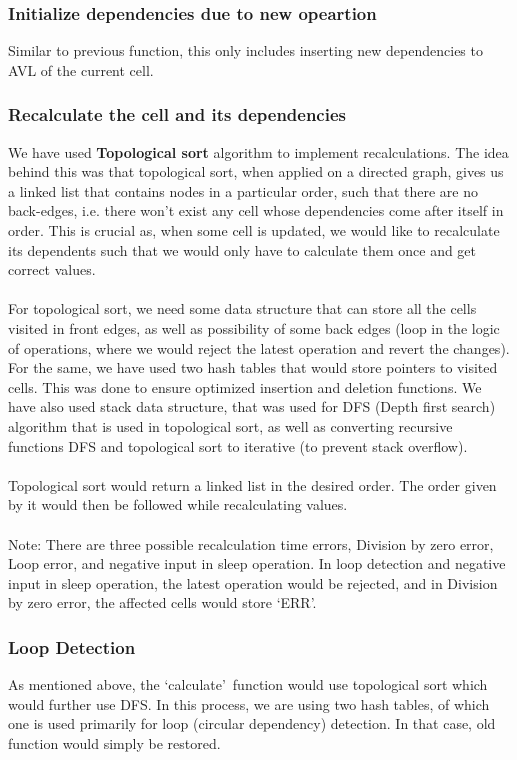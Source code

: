 \documentclass{article}
\begin{document}
\subsubsection{Initialize dependencies due to new opeartion}
Similar to previous function, this only includes inserting new dependencies to AVL of the current cell.
\subsubsection{Recalculate the cell and its dependencies}
We have used \textbf{Topological sort} algorithm to implement recalculations. The idea behind this was that topological sort, when applied on a directed graph, gives us a linked list that contains nodes in a particular order, such that there are no back-edges, i.e. there won't exist any cell whose dependencies come after itself in order. This is crucial as, when some cell is updated, we would like to recalculate its dependents such that we would only have to calculate them once and get correct values. 
\\ \\
For topological sort, we need some data structure that can store all the cells visited in front edges, as well as possibility of some back edges (loop in the logic of operations, where we would reject the latest operation and revert the changes). For the same, we have used two hash tables that would store pointers to visited cells. This was done to ensure optimized insertion and deletion functions. We have also used stack data structure, that was used for DFS (Depth first search) algorithm that is used in topological sort, as well as converting recursive functions DFS and topological sort to iterative (to prevent stack overflow).
\\ \\ 
Topological sort would return a linked list in the desired order. The order given by it would then be followed while recalculating values.
\\ \\ 
Note: There are three possible recalculation time errors, Division by zero error, Loop error, and negative input in sleep operation. In loop detection and negative input in sleep operation, the latest operation would be rejected, and in Division by zero error, the affected cells would store \textquoteleft ERR\textquoteright.

\subsubsection{Loop Detection}
As mentioned above, the \textquoteleft calculate\textquoteright \ function would use topological sort which would further use DFS. In this process, we are using two hash tables, of which one is used primarily for loop (circular dependency) detection. In that case, old function would simply be restored.
\end{document}
